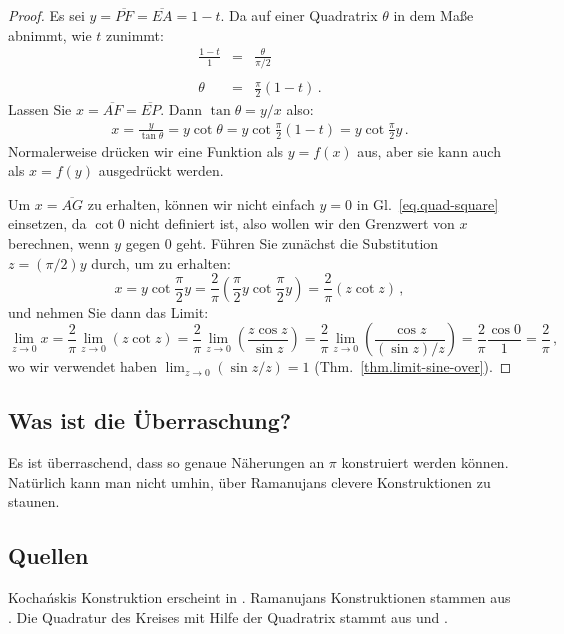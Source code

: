 \begin{proof}
Es sei $y=\overline{PF}=\overline{EA}=1-t$. Da auf einer Quadratrix $\theta$ in dem Maße abnimmt, wie $t$ zunimmt:
\begin{eqnarray*}
\frac{1-t}{1} &=& \frac{\theta}{\pi/2}\\
&&\\
\theta &=&\frac{\pi}{2}(1-t)\,.
\end{eqnarray*}
Lassen Sie $x=\overline{AF}=\overline{EP}$. Dann $\tan \theta = y/x$ also:
\begin{align}\label{eq.quad-square}
x = \frac{y}{\tan\theta}=y\cot\theta=y\cot \frac{\pi}{2}(1-t)=y\cot \frac{\pi}{2}y\,.
\end{align}
Normalerweise drücken wir eine Funktion als $y=f(x)$ aus, aber sie kann auch als $x=f(y)$ ausgedrückt werden. 

Um $x=\overline{AG}$ zu erhalten, können wir nicht einfach $y=0$ in Gl.~\ref{eq.quad-square} einsetzen, da $\cot 0$ nicht definiert ist, also wollen wir den Grenzwert von $x$ berechnen, wenn $y$ gegen $0$ geht. 
Führen Sie zunächst die Substitution $z=(\pi/2)y$ durch, um zu erhalten:
\[
x = y\cot \frac{\pi}{2}y = \frac{2}{\pi} \left(\frac{\pi}{2}y\cot \frac{\pi}{2}y\right)=\frac{2}{\pi}(z\cot z)\,,
\]
und nehmen Sie dann das Limit:
\[
\lim_{z\rightarrow 0} x=\frac{2}{\pi}\lim_{z\rightarrow 0} (z\cot z) = \frac{2}{\pi}\lim_{z\rightarrow 0} \left(\frac{z\cos z}{\sin z}\right) = \frac{2}{\pi}\lim_{z\rightarrow 0} \left(\frac{\cos z}{(\sin z)/z}\right) = \frac{2}{\pi}\frac{\cos 0}{1} = \frac{2}{\pi}\,,
\]
wo wir verwendet haben $\lim_{z\rightarrow 0} (\sin z/z)=1$ (Thm.~\ref{thm.limit-sine-over}).
\end{proof}

\subsection*{Was ist die Überraschung?}

Es ist überraschend, dass so genaue Näherungen an $\pi$ konstruiert werden können. Natürlich kann man nicht umhin, über Ramanujans clevere Konstruktionen zu staunen.

\subsection*{Quellen}
Kocha\'{n}skis Konstruktion erscheint in \cite{bold}. Ramanujans Konstruktionen stammen aus \cite{ramanujan1,ramanujan2}. Die Quadratur des Kreises mit Hilfe der Quadratrix stammt aus \cite[pp.~48--49]{martin} und \cite{wiki:quad}.
